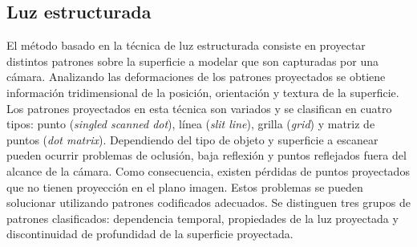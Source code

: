 \subsection{Luz estructurada}

El método basado en la técnica de luz estructurada consiste en proyectar distintos patrones sobre la superficie a modelar que son capturadas por una cámara. Analizando las deformaciones de los patrones proyectados se obtiene información tridimensional de la posición, orientación y textura de la superficie\cite{SLightPatterns}.
Los patrones proyectados en esta técnica son variados y se clasifican en cuatro tipos: punto (\emph{singled scanned dot}), línea (\emph{slit line}), grilla (\emph{grid}) y matriz de puntos (\emph{dot matrix}).
Dependiendo del tipo de objeto y superficie a escanear pueden ocurrir problemas de oclusión, baja reflexión y puntos reflejados fuera del alcance de la cámara. Como consecuencia, existen pérdidas de puntos proyectados que no tienen proyección en el plano imagen.
Estos problemas se pueden solucionar utilizando patrones codificados adecuados. Se distinguen tres grupos de patrones clasificados: dependencia temporal, propiedades de la luz proyectada y discontinuidad de profundidad de la superficie proyectada\cite{SLightCorrespondence}.
